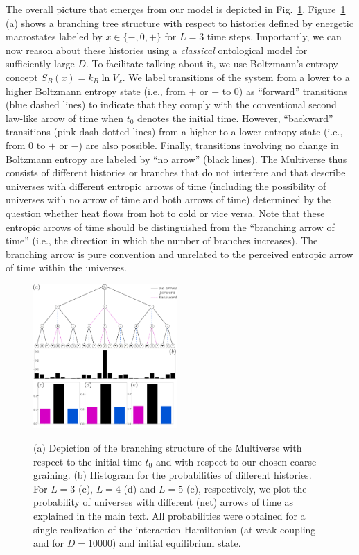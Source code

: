 \documentclass[pre,twocolumn,10pt,aps,longbibliography,nofootinbib]{revtex4-1}
\newcommand{\blue}[1]{#1}
\begin{document}
The overall picture that emerges from our model is depicted in Fig.~\ref{fig tree}. Figure~\ref{fig tree} (a) shows a branching tree structure with respect to histories defined by energetic macrostates labeled by $x\in\{-,0,+\}$ for $L=3$ time steps. Importantly, we can now reason about these histories using a \emph{classical} ontological model for sufficiently large $D$. To facilitate talking about it, we use Boltzmann's entropy concept $S_B(x) = k_B\ln V_x$. We label transitions of the system from a lower to a higher Boltzmann entropy state (i.e., from $+$ or $-$ to $0$) as ``forward'' transitions (blue dashed lines) to indicate that they comply with the conventional \blue{second law-like} arrow of time when $t_0$ denotes the initial time. However, ``backward'' transitions (pink dash-dotted lines) from a higher to a lower entropy state (i.e., from $0$ to $+$ or $-$) are also possible. Finally, transitions involving no change in Boltzmann entropy are labeled by ``no arrow'' (black lines). The Multiverse thus consists of different histories or branches that do not interfere and that describe universes with different \blue{entropic} arrows of time (including the possibility of universes with no arrow of time and both arrows of time) determined by the question whether heat flows from hot to cold or vice versa. \blue{Note that these entropic arrows of time should be distinguished from the ``branching arrow of time'' (i.e., the direction in which the number of branches increases). The branching arrow is pure convention and unrelated to the perceived entropic arrow of time within the universes.}

\begin{figure}[t]
 \centering\includegraphics[width=0.49\textwidth,clip=true]{tree2.pdf}
 \label{fig tree}
 \caption{(a) Depiction of the branching structure of the Multiverse with respect to the initial time $t_0$ and with respect to our chosen coarse-graining. (b) Histogram for the probabilities of different histories. For $L=3$ (c), $L=4$ (d) and $L=5$ (e), respectively, we plot the probability of universes with different (net) arrows of time as explained in the main text. All probabilities were obtained for a single realization of the interaction Hamiltonian (at weak coupling and for $D=10000$) and initial equilibrium state. }
\end{figure}
\end{document}
